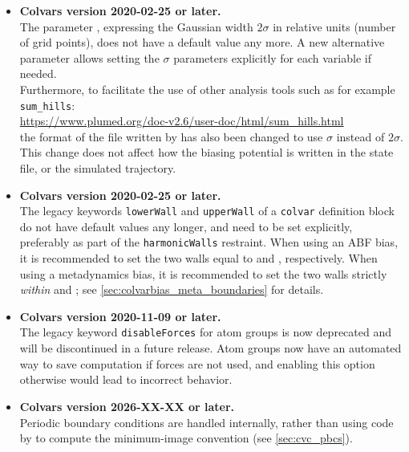 \begin{itemize}
\item \textbf{Colvars version 2020-02-25 or later.}\\
  The parameter , expressing the Gaussian width $2\sigma$ in relative units (number of grid points), does not have a default value any more.
  A new alternative parameter  allows setting the $\sigma$ parameters explicitly for each variable if needed.\\
  Furthermore, to facilitate the use of other analysis tools such as for example \texttt{sum\_hills}:\\
\url{https://www.plumed.org/doc-v2.6/user-doc/html/sum_hills.html}\\
  the format of the file written by  has also been changed to use $\sigma$ instead of $2\sigma$.
  This change does not affect how the biasing potential is written in the state file, or the simulated trajectory.

\item \textbf{Colvars version 2020-02-25 or later.}\\
  The legacy keywords \texttt{lowerWall} and \texttt{upperWall} of a \texttt{colvar} definition block do not have default values any longer, and need to be set explicitly, preferably as part of the \texttt{harmonicWalls} restraint.
  When using an ABF bias, it is recommended to set the two walls equal to  and , respectively.
  When using a metadynamics bias, it is recommended to set the two walls strictly \emph{within}  and ; see \ref{sec:colvarbias_meta_boundaries} for details.

\item \textbf{Colvars version 2020-11-09 or later.}\\
  The legacy keyword \texttt{disableForces} for atom groups is now deprecated and will be discontinued in a future release.
  Atom groups now have an automated way to save computation if forces are not used, and enabling this option otherwise would lead to incorrect behavior.

\item \textbf{Colvars version 2026-XX-XX or later.}\\
  Periodic boundary conditions are handled internally, rather than using code by \MDENGINE{} to compute the minimum-image convention (see \ref{sec:cvc_pbcs}).

\end{itemize}


